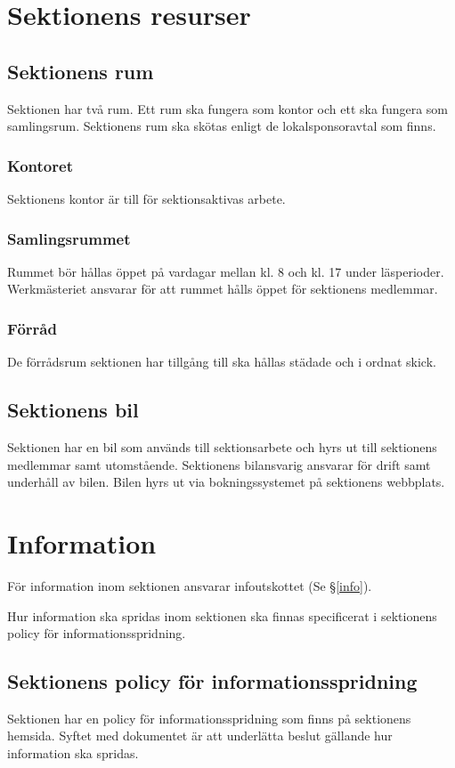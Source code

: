 \documentclass{datateknologsektionen-document}
\begin{document}
\section{Sektionens resurser}
\subsection{Sektionens rum}
Sektionen har två rum. Ett rum ska fungera som kontor och ett ska fungera som samlingsrum.
Sektionens rum ska skötas enligt de lokalsponsoravtal som finns.
\subsubsection{Kontoret}
Sektionens kontor är till för sektionsaktivas arbete.
\subsubsection{Samlingsrummet}
Rummet bör hållas öppet på vardagar mellan kl. 8 och kl. 17 under läsperioder.
Werkmästeriet ansvarar för att rummet hålls öppet för sektionens medlemmar.
\subsubsection{Förråd}
De förrådsrum sektionen har tillgång till ska hållas städade och i ordnat skick.
\subsection{Sektionens bil}
Sektionen har en bil som används till sektionsarbete och hyrs ut till sektionens medlemmar samt
utomstående. Sektionens bilansvarig ansvarar för drift samt underhåll av bilen. Bilen hyrs ut via
bokningssystemet på sektionens webbplats.

\section{Information}
För information inom sektionen ansvarar infoutskottet (Se \S \ref{info}).

Hur information ska spridas inom sektionen ska finnas specificerat i sektionens policy för
informationsspridning.

\subsection{Sektionens policy för informationsspridning}
Sektionen har en policy för informationsspridning som finns på sektionens hemsida. Syftet med
dokumentet är att underlätta beslut gällande hur information ska spridas.
\end{document}
